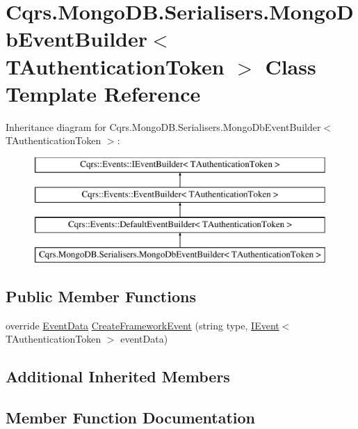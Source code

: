 \hypertarget{classCqrs_1_1MongoDB_1_1Serialisers_1_1MongoDbEventBuilder}{}\section{Cqrs.\+Mongo\+D\+B.\+Serialisers.\+Mongo\+Db\+Event\+Builder$<$ T\+Authentication\+Token $>$ Class Template Reference}
\label{classCqrs_1_1MongoDB_1_1Serialisers_1_1MongoDbEventBuilder}
Inheritance diagram for Cqrs.\+Mongo\+D\+B.\+Serialisers.\+Mongo\+Db\+Event\+Builder$<$ T\+Authentication\+Token $>$\+:\begin{figure}[H]
\begin{center}
\leavevmode
\includegraphics[height=4.000000cm]{classCqrs_1_1MongoDB_1_1Serialisers_1_1MongoDbEventBuilder}
\end{center}
\end{figure}
\subsection*{Public Member Functions}
\begin{DoxyCompactItemize}
\item 
override \hyperlink{classCqrs_1_1Events_1_1EventData}{Event\+Data} \hyperlink{classCqrs_1_1MongoDB_1_1Serialisers_1_1MongoDbEventBuilder_a06afbb994fd3f679f275dea3d1d60c6e_a06afbb994fd3f679f275dea3d1d60c6e}{Create\+Framework\+Event} (string type, \hyperlink{interfaceCqrs_1_1Events_1_1IEvent}{I\+Event}$<$ T\+Authentication\+Token $>$ event\+Data)
\end{DoxyCompactItemize}
\subsection*{Additional Inherited Members}


\subsection{Member Function Documentation}
\mbox{\label{classCqrs_1_1MongoDB_1_1Serialisers_1_1MongoDbEventBuilder_a06afbb994fd3f679f275dea3d1d60c6e_a06afbb994fd3f679f275dea3d1d60c6e}} 
